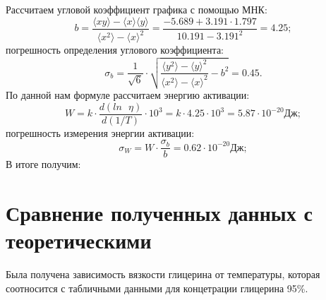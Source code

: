 \documentclass{letnab}
\begin{document}
Рассчитаем угловой коэффициент графика с помощью МНК:
\begin{equation}
	b = \dfrac{\langle x  y \rangle - \langle x\rangle  \langle
	y \rangle}{\langle x^2 \rangle - \langle x \rangle ^ 2} = \dfrac{-5.689 + 3.191 \cdot 1.797}{10.191 - 3.191 ^ 2} = 4.25;
\end{equation}
погрешность определения углового коэффициента:
\begin{equation}
\sigma_b = \dfrac{1}{\sqrt{6}} \cdot \sqrt{\dfrac{\langle y^2 \rangle - \langle y \rangle ^ 2}{\langle x^2 \rangle - \langle x \rangle ^ 2} - b ^ 2} = 0.45.
\end{equation}
По данной нам формуле рассчитаем энергию активации:
\begin{equation}
W = k\cdot\dfrac{d(ln\text{ }\eta)}{d(1/T)}\cdot 10 ^ 3 = k \cdot 4.25 \cdot 10 ^ 3=5.87 \cdot 10 ^ {-20}  \text{Дж};
\end{equation}
погрешность измерения энергии активации:
\begin{equation}
\sigma_W = W \cdot \frac{\sigma_b}{b} = 0.62 \cdot 10^{-20} Дж;
\end{equation}
\Large В итоге получим:  
\normalsize
\section{Сравнение полученных данных с теоретическими}
Была получена зависимость вязкости глицерина от температуры, которая соотносится с табличными данными для концетрации глицерина 95\%.
\end{document}

